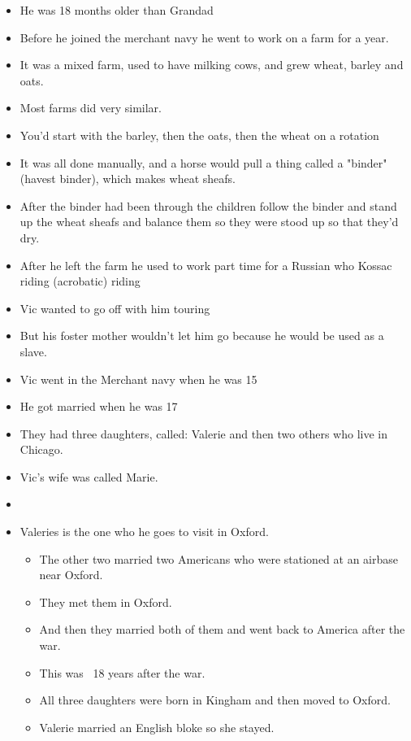\documentclass[10pt,twocolumn,letterpaper]{article}
\begin{document}
\begin{itemize}
\begin{itemize}
        \item He was 18 months older than Grandad
        \item Before he joined the merchant navy he went to work on a farm for a year.
        \item It was a mixed farm, used to have milking cows, and grew wheat, barley and oats.
        \item Most farms did very similar.
        \item You'd start with the barley, then the oats, then the wheat on a rotation
        \item It was all done manually, and a horse would pull a thing called a "binder" (havest binder), which makes wheat sheafs.
        \item After the binder had been through the children follow the binder and stand up the wheat sheafs and balance them so they were stood up so that they'd dry.
        \item After he left the farm he used to work part time for a Russian who Kossac riding (acrobatic) riding
        \item Vic wanted to go off with him touring
        \item But his foster mother wouldn't let him go because he would be used as a slave.
        \item Vic went in the Merchant navy when he was 15
        \item He got married when he was 17
        \item They had three daughters, called: Valerie and then two others who live in Chicago.
        \item Vic's wife was called Marie.
        \item 
        \item Valeries is the one who he goes to visit in Oxford.
        \begin{itemize}
            \item The other two married two Americans who were stationed at an airbase near Oxford.
            \item They met them in Oxford.
            \item And then they married both of them and went back to America after the war.
            \item This was ~18 years after the war.
            \item All three daughters were born in Kingham and then moved to Oxford.
            \item Valerie married an English bloke so she stayed.

\end{itemize}
\end{itemize}
\end{itemize}
\end{document}
